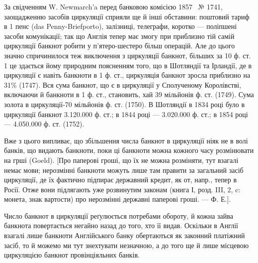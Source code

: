 За свідченням W. Newmarch’a перед банковою комісією 1857~ № 1741,
заощадженню засобів циркуляції сприяли ще й інші обставини: поштовий тариф
в 1 пенс (das Penny-Briefporto), залізниці, телеграфи, коротко — поліпшені засоби
комунікації; так що Англія тепер має змогу при приблизно тій самій циркуляції
банкнот робити у п’ятеро-шестеро більш операцій. Але до цього значно
спричинилося теж виключення з циркуляції банкнот, більших за 10 ф. ст. 1 це
здається йому природним поясненням того, що в Шотляндії та Ірландії, де в
циркуляції є навіть банкноти в 1 ф. ст., циркуляція банкнот зросла приблизно
на 31\% (1747). Вся сума банкнот, що є в циркуляції у Сполученому Королівстві,
включаючи й банкноти в 1 ф. ст., становить, хай 39 мільйонів ф. ст.
(1749). Сума золота в циркуляції-70 мільйонів ф. ст. (1750). В Шотляндії
в 1834 році було в циркуляції банкнот 3.120.000 ф. ст.; в 1844 році —
3.020.000 ф. ст.; в 1854 році — 4.050.000 ф. ст. (1752).

Вже з цього випливає, що збільшення числа банкнот в циркуляції ніяк
не в волі банків, що видають банкноти, поки ці банкноти можна кожного часу
розмінювати на грші (Goeld). [Про паперові гроші, що їх не можна розміняти,
тут взагалі немає мови; нерозмінні банкноти можуть лише там правити за загальний
засіб циркуляції, де їх фактично підпирає державний кредит, як от, напр., тепер
в Росії. Отже вони підлягають уже розвинутим законам (книга І, розд. III, 2, c:
монета, знак вартости) про нерозмінні державні паперові гроші. — Ф. Е.].

Число банкнот в циркуляції реґулюється потребами обороту, й кожна
зайва банкнота повертається негайно назад до того, хто її видав. Оскільки в
Англії взагалі лише банкноти Англійського банку обертаються як законний
платіжний засіб, то й можемо ми тут знехтувати незначною, а до того ще й лише
місцевою циркуляцією банкнот провінціяльних банків.
